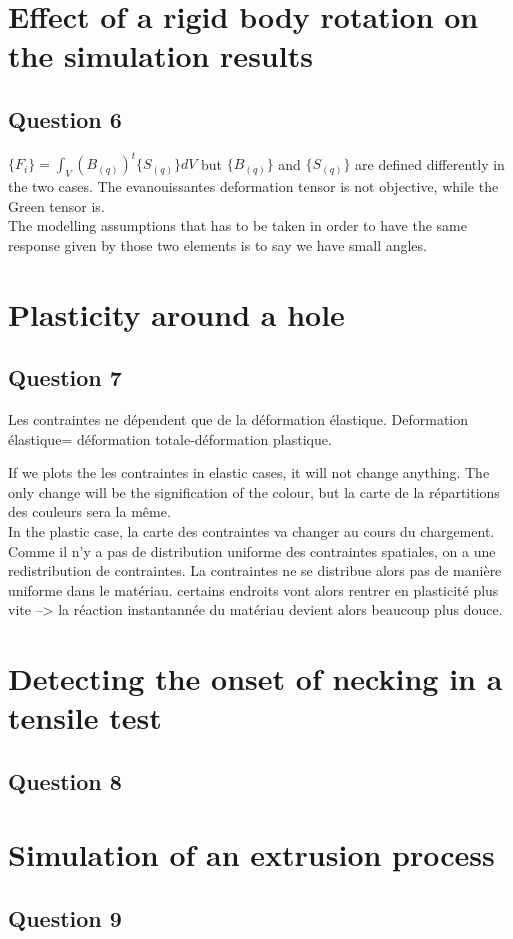 \documentclass[12pt,a4paper]{article}
\begin{document}
\section*{Effect of a rigid body rotation on the simulation results}
\subsection*{Question 6}


$\{F_i\}=\int_{V} (B_{(q)})^t\{S_{(q)}\}dV$
but $\{B_{(q)}\}$ and $\{S_{(q)}\}$ are defined differently in the two cases.
The evanouissantes deformation tensor is not objective, while the Green tensor is.
\\The modelling assumptions that has to be taken in order to have the same response given by those two elements is to say we have small angles.



\section*{Plasticity around a hole}
\subsection*{Question 7}
Les contraintes ne dépendent que de la déformation élastique. Deformation élastique= déformation totale-déformation plastique.

If we plots the les contraintes in elastic cases, it will not change anything. The only change will be the signification of the colour, but la carte de la répartitions des couleurs sera la même.
\\In the plastic case, la carte des contraintes va changer au cours du chargement.
Comme il n'y a pas de distribution uniforme des contraintes spatiales, on a une redistribution de contraintes. La contraintes ne se distribue alors pas de manière uniforme dans le matériau. certains endroits vont alors rentrer en plasticité plus vite --> la réaction instantannée du matériau devient alors beaucoup plus douce.

\section*{Detecting the onset of necking in a tensile test
}

\subsection*{Question 8}

\section*{
Simulation of an extrusion process}
\subsection*{Question 9}
\end{document}
